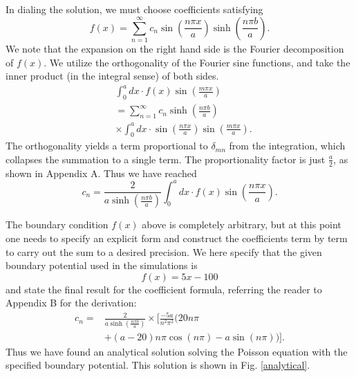 \documentclass[reprint, amsmath, amssymb, aps, floatfix]{revtex4-1}
\begin{document}
In dialing the solution, we must choose coefficients satisfying \begin{equation}
f(x)=\sum_{n=1}^\infty c_n \sin\left(\frac{n\pi x}{a}\right)\sinh\left(\frac{n\pi b}{a}\right). \label{feq}\end{equation} We note that the expansion on the right hand side is the Fourier decomposition of $f(x)$. We utilize the orthogonality of the Fourier sine functions, and take the inner product (in the integral sense) of both sides. \begin{equation}
\begin{aligned}
&\int_{0}^{a}dx\cdot f(x)\sin\left(\frac{m\pi x}{a}\right)\\&= \sum_{n=1}^\infty c_n \sinh\left(\frac{n\pi b}{a}\right)\\&\times\int_0^a dx\cdot \sin\left(\frac{n\pi x}{a}\right)\sin\left(\frac{m \pi x}{a}\right).
\end{aligned}
\end{equation} The orthogonality yields a term proportional to $\delta_{mn}$ from the integration, which collapses the summation to a single term. The proportionality factor is just $\frac{a}{2}$, as shown in Appendix A. Thus we have reached \begin{equation}
c_n = \frac{2}{a\sinh\left(\frac{n\pi b}{a}\right)} \int_{0}^{a} dx\cdot f(x)\sin\left(\frac{n\pi x}{a}\right). \label{constant}
\end{equation}

The boundary condition $f(x)$ above is completely arbitrary, but at this point one needs to specify an explicit form and construct the coefficients term by term to carry out the sum to a desired precision. We here specify that the given boundary potential used in the simulations is \begin{equation}
f(x)=5x-100 \label{fofx}
\end{equation} and state the final result for the coefficient formula, referring the reader to Appendix B for the derivation: \begin{equation}
\begin{aligned}
c_n =& \frac{2}{a\sinh\left(\frac{n\pi b}{a}\right)}\times\biggl[\frac{-5a}{n^2\pi^2}\biggl(20n\pi\\
&+(a-20)n\pi\cos(n\pi)-a\sin(n\pi)\biggr)\biggr].
\label{finalceq}
\end{aligned}
\end{equation} Thus we have found an analytical solution solving the Poisson equation with the specified boundary potential. This solution is shown in Fig. \ref{analytical}.
\end{document}
